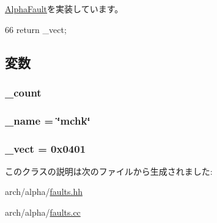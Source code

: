 \hyperlink{classAlphaISA_1_1AlphaFault_ac141ef2ab527bd4d5c079ddff2e8b4aa}{AlphaFault}を実装しています。


\begin{DoxyCode}
66 {return _vect;}
\end{DoxyCode}


\subsection{変数}
\hypertarget{classAlphaISA_1_1MachineCheckFault_a4bff925c412f331c5aaf6a39b79619ff}{
\subsubsection[{\_\-count}]{ {\bf \_\-count}}}
\label{classAlphaISA_1_1MachineCheckFault_a4bff925c412f331c5aaf6a39b79619ff}
\hypertarget{classAlphaISA_1_1MachineCheckFault_ac79073ffcd2c66a09bcd3bd3ad206019}{
\subsubsection[{\_\-name}]{ {\bf \_\-name} = \char`\"{}mchk\char`\"{}}}
\label{classAlphaISA_1_1MachineCheckFault_ac79073ffcd2c66a09bcd3bd3ad206019}
\hypertarget{classAlphaISA_1_1MachineCheckFault_ad9e5855b9db0b2824cf6c507be4a872e}{
\subsubsection[{\_\-vect}]{ {\bf \_\-vect} = 0x0401}}
\label{classAlphaISA_1_1MachineCheckFault_ad9e5855b9db0b2824cf6c507be4a872e}


このクラスの説明は次のファイルから生成されました:\begin{DoxyCompactItemize}
\item 
arch/alpha/\hyperlink{arch_2alpha_2faults_8hh}{faults.hh}\item 
arch/alpha/\hyperlink{arch_2alpha_2faults_8cc}{faults.cc}\end{DoxyCompactItemize}
